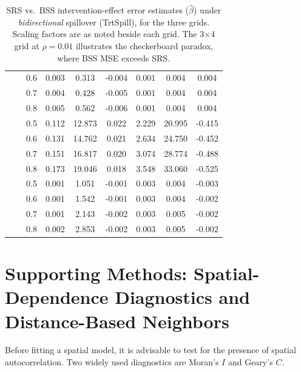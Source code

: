 \documentclass{article}[11pt]
\begin{document}
\begin{table}[ht!]
{\begin{tabular}{l c c ccc ccc}
    & & 0.6 & 0.003 & 0.313 & -0.004 & 0.001 & 0.004 & 0.004 \\
    & & 0.7 & 0.004 & 0.428 & -0.005 & 0.001 & 0.004 & 0.004 \\
    & & 0.8 & 0.005 & 0.562 & -0.006 & 0.001 & 0.004 & 0.004 \\
    \midrule
     &  & 0.5 & 0.112 & 12.873 & 0.022 & 2.229 & 20.995 & -0.415 \\
    & & 0.6 & 0.131 & 14.762 & 0.021 & 2.634 & 24.750 & -0.452 \\
    & & 0.7 & 0.151 & 16.817 & 0.020 & 3.074 & 28.774 & -0.488 \\
    & & 0.8 & 0.173 & 19.046 & 0.018 & 3.548 & 33.060 & -0.525 \\
    \cmidrule(lr){2-9}
    &  & 0.5 & 0.001 & 1.051 & -0.001 & 0.003 & 0.004 & -0.003 \\
    & & 0.6 & 0.001 & 1.542 & -0.001 & 0.003 & 0.004 & -0.002 \\
    & & 0.7 & 0.001 & 2.143 & -0.002 & 0.003 & 0.005 & -0.002 \\
    & & 0.8 & 0.002 & 2.853 & -0.002 & 0.003 & 0.005 & -0.002 \\
    \bottomrule
\end{tabular}}
\caption{SRS vs.\ BSS intervention-effect error estimates ($\hat{\beta}$) under \emph{bidirectional} spillover (TrtSpill), for the three grids. Scaling factors are as noted beside each grid. The 3$\times$4 grid at $\rho=0.01$ illustrates the checkerboard paradox, where BSS MSE exceeds SRS.}
\label{table:InterventionEstimatesSpill}
\end{table}

\section{Supporting Methods: Spatial-Dependence Diagnostics and Distance-Based Neighbors}\label{appendix:MoransI}

Before fitting a spatial model, it is advisable to test for the presence of spatial autocorrelation. Two widely used diagnostics are Moran's $\textit{I}$\cite{moran_interpretation_1948}\cite{moran_notes_1950} and Geary's $\textit{C}$\cite{geary_contiguity_1954}\cite{waller_applied_2004}.
\end{document}
